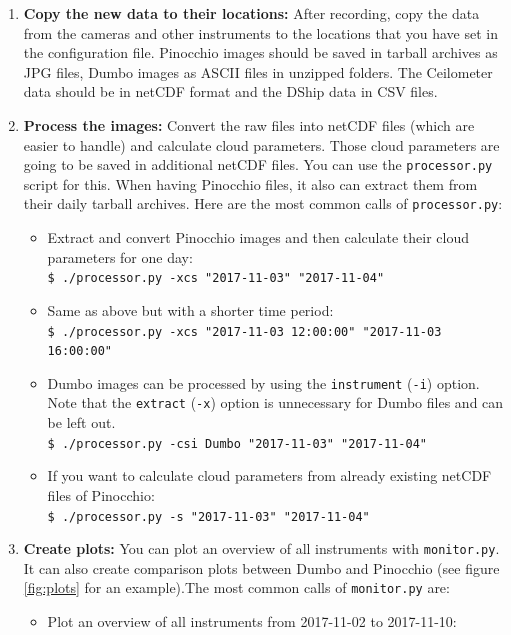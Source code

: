 \documentclass[11pt,a4paper]{article}
\begin{document}
\begin{enumerate}
	\item \textbf{Copy the new data to their locations:} After recording, copy the data from the cameras and other instruments to the locations that you have set in the configuration file. Pinocchio images should be saved in tarball archives as JPG files, Dumbo images as ASCII files in unzipped folders. The Ceilometer data should be in netCDF format and the DShip data in CSV files.
	\item \textbf{Process the images:} Convert the raw files into netCDF files (which are easier to handle) and calculate cloud parameters. Those cloud parameters are going to be saved in additional netCDF files. You can use the \texttt{processor.py} script for this. When having Pinocchio files, it also can extract them from their daily tarball archives. Here are the most common calls of \texttt{processor.py}:
	\begin{itemize}
		\item Extract and convert Pinocchio images and then calculate their cloud parameters for one day:\\
		\texttt{\$ ./processor.py -xcs "2017-11-03" "2017-11-04" }
		\item Same as above but with a shorter time period:\\
		\texttt{\$ ./processor.py -xcs "2017-11-03 12:00:00" "2017-11-03 16:00:00" }
		\item Dumbo images can be processed by using the \texttt{instrument} (\texttt{-i}) option. Note that the \texttt{extract} (\texttt{-x}) option is unnecessary for Dumbo files and can be left out.\\
		\texttt{\$ ./processor.py -csi Dumbo "2017-11-03" "2017-11-04" }
		\item If you want to calculate cloud parameters from already existing netCDF files of Pinocchio: \\
		\texttt{\$ ./processor.py -s "2017-11-03" "2017-11-04" }
	\end{itemize}
	\item \textbf{Create plots:}  You can plot an overview of all instruments with \texttt{monitor.py}. It can also create comparison plots between Dumbo and Pinocchio (see figure \ref{fig:plots} for an example).The most common calls of \texttt{monitor.py} are:
	\begin{itemize}
		\item Plot an overview of all instruments from 2017-11-02 to 2017-11-10:\\

\end{itemize}
\end{enumerate}
\end{document}
